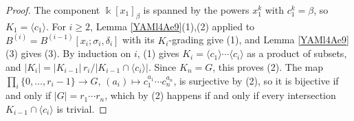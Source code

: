 \documentclass[reqno]{amsart}
\numberwithin{equation}{section}
\theoremstyle{definition}
\theoremstyle{remark}
\theoremstyle{plain}
\newcommand{\kk}{\Bbbk}
\begin{document}
\begin{proof}
The component $\kk[x_1]_\beta$ is spanned by the powers $x_1^k$ with $c_1^k=\beta$, so $K_1=\langle c_1\rangle$. For $i\ge2$, Lemma \ref{YAMl4Ae9}(1),(2) applied to $B^{(i)}=B^{(i-1)}[x_i;\sigma_i,\delta_i]$ with its $K_i$-grading give (1), and Lemma \ref{YAMl4Ae9}(3) gives (3). By induction on $i$, (1) gives $K_i=\langle c_1\rangle\cdots\langle c_i\rangle$ as a product of subsets, and $|K_i|=|K_{i-1}|\,r_i/|K_{i-1}\cap\langle c_i\rangle|$. Since $K_n=G$, this proves (2). The map $\prod_i\{0,\dots,r_i-1\}\to G$, $(a_i)\mapsto c_1^{a_1}\cdots c_n^{a_n}$, is surjective by (2), so it is bijective if and only if $|G|=r_1\cdots r_n$, which by (2) happens if and only if every intersection $K_{i-1}\cap\langle c_i\rangle$ is trivial.
\end{proof}
\end{document}
